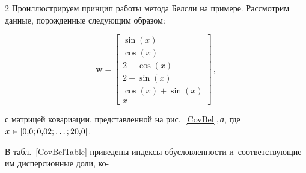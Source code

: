 \begin{multicols}{2}
Проиллюстрируем принцип работы метода Белсли на примере. Рас\-смот\-рим данные, 
по\-рож\-ден\-ные сле\-ду\-ющим образом:

\vspace*{2pt}

\noindent
$$
\mathbf{w} = \begin{bmatrix}
\sin(x)\\
\cos (x)\\
2+\cos(x)\\
2+\sin(x)\\
\cos(x) + \sin(x)\\
x
\end{bmatrix}\,,
$$

\vspace*{-2pt}


\noindent
с матрицей ковариации, пред\-став\-лен\-ной на рис.~\ref{CovBel},\,\textit{а}, где $x \hm\in 
[0{,}0; 0{,}02; \ldots; 20{,}0]$.

В табл.~\ref{CovBelTable} приведены индексы обуслов\-лен\-ности и~соответствующие им 
дис\-пер\-си\-он\-ные доли, ко-\linebreak\vspace*{-12pt}

\pagebreak

\end{multicols}

\begin{figure*} %
  \vspace*{1pt}
    \begin{center}  
  \mbox{%
 \epsfxsize=161.599mm 
 }
 \end{center}
\vspace*{-11pt}
\label{CovBel}
\vspace*{-12pt}
\end{figure*}

